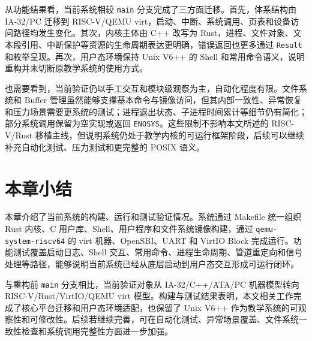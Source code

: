 从功能结果看，当前系统相较 \verb|main| 分支完成了三方面迁移。首先，体系结构由 IA-32/PC 迁移到 RISC-V/QEMU virt，启动、中断、系统调用、页表和设备访问路径均发生变化。其次，内核主体由 C++ 改写为 Rust，进程、文件对象、文本段引用、中断保护等资源的生命周期表达更明确，错误返回也更多通过 \verb|Result| 和枚举呈现。再次，用户态环境保持 Unix V6++ 的 Shell 和常用命令语义，说明重构并未切断原教学系统的使用方式。

也需要看到，当前验证仍以手工交互和模块级观察为主，自动化程度有限。文件系统和 Buffer 管理虽然能够支撑基本命令与镜像访问，但其内部一致性、异常恢复和压力场景需要更系统的测试；进程退出状态、子进程时间累计等细节仍有简化；部分系统调用保留为空实现或返回 \verb|ENOSYS|。这些限制不影响本文所述的 RISC-V/Rust 移植主线，但说明系统仍处于教学内核的可运行框架阶段，后续可以继续补充自动化测试、压力测试和更完整的 POSIX 语义。

\section{本章小结}

本章介绍了当前系统的构建、运行和测试验证情况。系统通过 Makefile 统一组织 Rust 内核、C 用户库、Shell、用户程序和文件系统镜像构建，通过 \verb|qemu-system-riscv64| 的 virt 机器、OpenSBI、UART 和 VirtIO Block 完成运行。功能测试覆盖启动日志、Shell 交互、常用命令、进程生命周期、管道重定向和信号处理等路径，能够说明当前系统已经从底层启动到用户态交互形成可运行闭环。

与重构前 \verb|main| 分支相比，当前验证对象从 IA-32/C++/ATA/PC 机器模型转向 RISC-V/Rust/VirtIO/QEMU virt 模型。构建与测试结果表明，本文相关工作完成了核心平台迁移和用户态环境适配，也保留了 Unix V6++ 作为教学系统的可观察性和可修改性。后续若继续完善，可在自动化测试、异常场景覆盖、文件系统一致性检查和系统调用完整性方面进一步加强。
